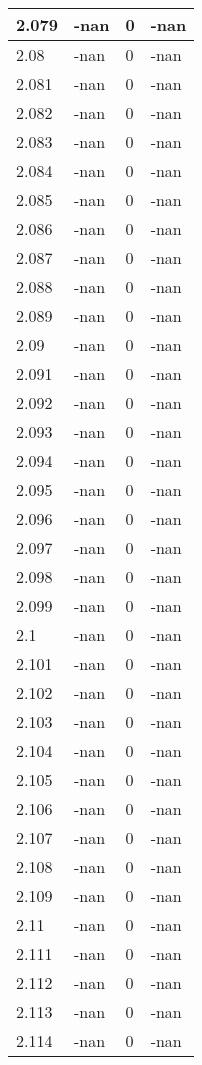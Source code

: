 \documentclass[a4paper,14pt]{extarticle}
\begin{document}
\begin{longtable}{||m{3cm}||m{3cm}|m{3cm}||m{3cm}||}
\hline
2.079 & -nan & 0 & -nan\\
\hline
2.08 & -nan & 0 & -nan\\
\hline
2.081 & -nan & 0 & -nan\\
\hline
2.082 & -nan & 0 & -nan\\
\hline
2.083 & -nan & 0 & -nan\\
\hline
2.084 & -nan & 0 & -nan\\
\hline
2.085 & -nan & 0 & -nan\\
\hline
2.086 & -nan & 0 & -nan\\
\hline
2.087 & -nan & 0 & -nan\\
\hline
2.088 & -nan & 0 & -nan\\
\hline
2.089 & -nan & 0 & -nan\\
\hline
2.09 & -nan & 0 & -nan\\
\hline
2.091 & -nan & 0 & -nan\\
\hline
2.092 & -nan & 0 & -nan\\
\hline
2.093 & -nan & 0 & -nan\\
\hline
2.094 & -nan & 0 & -nan\\
\hline
2.095 & -nan & 0 & -nan\\
\hline
2.096 & -nan & 0 & -nan\\
\hline
2.097 & -nan & 0 & -nan\\
\hline
2.098 & -nan & 0 & -nan\\
\hline
2.099 & -nan & 0 & -nan\\
\hline
2.1 & -nan & 0 & -nan\\
\hline
2.101 & -nan & 0 & -nan\\
\hline
2.102 & -nan & 0 & -nan\\
\hline
2.103 & -nan & 0 & -nan\\
\hline
2.104 & -nan & 0 & -nan\\
\hline
2.105 & -nan & 0 & -nan\\
\hline
2.106 & -nan & 0 & -nan\\
\hline
2.107 & -nan & 0 & -nan\\
\hline
2.108 & -nan & 0 & -nan\\
\hline
2.109 & -nan & 0 & -nan\\
\hline
2.11 & -nan & 0 & -nan\\
\hline
2.111 & -nan & 0 & -nan\\
\hline
2.112 & -nan & 0 & -nan\\
\hline
2.113 & -nan & 0 & -nan\\
\hline
2.114 & -nan & 0 & -nan\\

\end{longtable}
\end{document}
